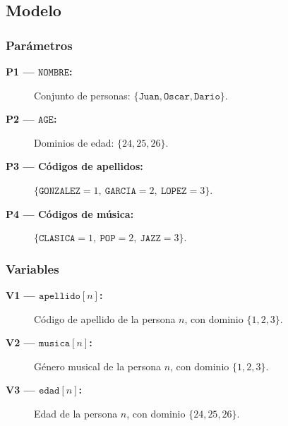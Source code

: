 
\subsection{Modelo}\label{sec:04-acertijo-logico-modelo}

\subsubsection*{Parámetros}
\begin{description}
  \item[\textbf{P1 — \(\texttt{NOMBRE}\):}] Conjunto de personas: \(\{\texttt{Juan},\texttt{Oscar},\texttt{Dario}\}\).
  \item[\textbf{P2 — \(\texttt{AGE}\):}] Dominios de edad: \(\{24,25,26\}\).
  \item[\textbf{P3 — Códigos de apellidos:}] \(\{\texttt{GONZALEZ}=1,\ \texttt{GARCIA}=2,\ \texttt{LOPEZ}=3\}\).
  \item[\textbf{P4 — Códigos de música:}] \(\{\texttt{CLASICA}=1,\ \texttt{POP}=2,\ \texttt{JAZZ}=3\}\).
\end{description}

\subsubsection*{Variables}
\begin{description}
  \item[\textbf{V1 — \(\texttt{apellido}[n]\):}] Código de apellido de la persona \(n\), con dominio \(\{1,2,3\}\).
  \item[\textbf{V2 — \(\texttt{musica}[n]\):}] Género musical de la persona \(n\), con dominio \(\{1,2,3\}\).
  \item[\textbf{V3 — \(\texttt{edad}[n]\):}] Edad de la persona \(n\), con dominio \(\{24,25,26\}\).
\end{description}

